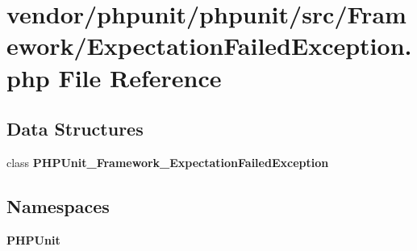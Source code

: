 \section{vendor/phpunit/phpunit/src/\+Framework/\+Expectation\+Failed\+Exception.php File Reference}
\label{_expectation_failed_exception_8php}
\subsection*{Data Structures}
\begin{DoxyCompactItemize}
\item 
class {\bf P\+H\+P\+Unit\+\_\+\+Framework\+\_\+\+Expectation\+Failed\+Exception}
\end{DoxyCompactItemize}
\subsection*{Namespaces}
\begin{DoxyCompactItemize}
\item 
 {\bf P\+H\+P\+Unit}
\end{DoxyCompactItemize}
